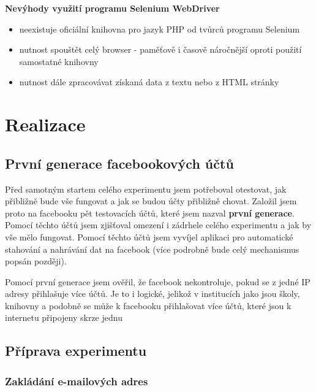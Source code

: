 \documentclass[thesis=M,czech]{FITthesis}[2013/05/10]
\begin{document}
\textbf{Nevýhody využití programu Selenium WebDriver}

\begin{itemize}
  \item neexistuje oficiální knihovna pro jazyk PHP 
  od tvůrců programu Selenium
  \item nutnost spouštět celý browser - paměťově i časově náročnější
  oproti použití samostatné knihovny
  \item nutnost dále zpracovávat získaná data z textu nebo z HTML stránky
\end{itemize}




\chapter{Realizace}

\section{První generace facebookových účtů}

Před samotným startem celého experimentu jsem potřeboval otestovat, jak přibližně bude vše fungovat a jak se budou účty přibližně chovat. Založil jsem proto na facebooku pět testovacích účtů, které jsem nazval \textbf{první generace}. Pomocí těchto účtů jsem zjišťoval omezení i zádrhele celého experimentu a jak by vše mělo fungovat. Pomocí těchto účtů jsem vyvíjel aplikaci pro automatické stahování a nahrávání dat na facebook (více podrobně bude celý mechanismus popsán později).

Pomocí první generace jsem ověřil, že facebook nekontroluje, pokud se z jedné IP adresy přihlašuje více účtů. Je to i logické, jelikož v institucích jako jsou školy, knihovny a podobně se může k facebooku přihlašovat více účtů, které jsou k internetu připojeny skrze jednu

\section{Příprava experimentu}

\subsection{Zakládání e-mailových adres}
\end{document}
